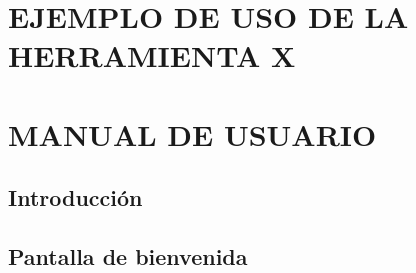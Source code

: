 \documentclass[spanish,twoside,openright,12pt,a4paper]{book}
\begin{document}

\appendix
\chapter{EJEMPLO DE USO DE LA HERRAMIENTA X}
\label{capituloUso}

\chapter{MANUAL DE USUARIO}
\label{capituloManual}

\section{Introducción}

\section{Pantalla de bienvenida}
\end{document}
